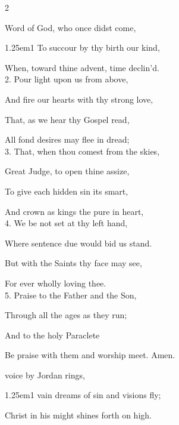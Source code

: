 \begin{paracol}{2}
\sloppy

\mattinsInvitatoryHymn\label{FirstAdventInvitatory}

 Word of God, who once didst come,


\begin{hangparas}{1.25em}{1}
To succour by thy birth our kind,

When, toward thine advent, time declin'd.\\

2. Pour light upon us from above,

And fire our hearts with thy strong love,

That, as we hear thy Gospel read,

All fond desires may flee in dread;\\

3. That, when thou comest from the skies,

Great Judge, to open thine assize,

To give each hidden sin its smart,

And crown as kings the pure in heart,\\

4. We be not set at thy left hand,

Where sentence due would bid us stand.

But with the Saints thy face may see,

For ever wholly loving thee.\\

5. Praise to the Father and the Son,

Through all the ages as they run;

And to the holy Paraclete

Be praise with them and worship meet. Amen.
\end{hangparas}

\switchcolumn

\mattinsOfficeHymn\label{FirstAdventMattins}

 voice by Jordan rings,


\begin{hangparas}{1.25em}{1}
vain dreams of sin and visions fly;

Christ in his might shines forth on high.\\


\end{hangparas}
\end{paracol}
